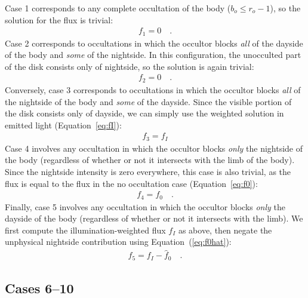 \documentclass[modern]{aastex62}
\begin{document}
Case 1 corresponds to any complete occultation of the body
($b_o \le r_o - 1$), so the solution for the flux is trivial:
%
\begin{align}
    \label{eq:f1}
    f_1 = 0
    \quad.
\end{align}
%
Case 2 corresponds to occultations in which the occultor blocks \emph{all} of
the dayside of the body and \emph{some} of the nightside. In this
configuration, the unocculted part of the disk consists only of nightside, so
the solution is again trivial:
%
\begin{align}{}
    \label{eq:f2}
    f_2 = 0
    \quad.
\end{align}
%
Conversely, case 3 corresponds to occultations in which the occultor blocks
\emph{all} of the nightside of the body and \emph{some} of the dayside.
Since the visible portion of the disk consists only of dayside, we can
simply use the weighted solution in emitted light
(Equation~\ref{eq:fI}):
%
\begin{align}
    \label{eq:f3}
    f_3 = f_I
\end{align}
%
Case 4 involves any occultation in which the occultor blocks \emph{only} the
nightside of the body (regardless of whether or not it intersects with the
limb of the body). Since the nightside intensity is zero everywhere, this case
is also trivial, as the flux is equal to the flux in the no occultation case
(Equation~\ref{eq:f0}):
%
\begin{align}
    \label{eq:f4}
    f_4 = f_0
    \quad.
\end{align}
%
Finally, case 5 involves any occultation in which the occultor blocks
\emph{only} the dayside of the body (regardless of whether or not it
intersects with the limb). We first compute the illumination-weighted flux
$f_I$ as above, then negate the unphysical nightside contribution
using Equation~(\ref{eq:f0hat}):
%
\begin{align}
    \label{eq:f5}
    f_5 = f_I - \hat{f}_0
    \quad.
\end{align}

%

\subsection{Cases 6--10}
\label{sec:cases-hard}
%
\end{document}
